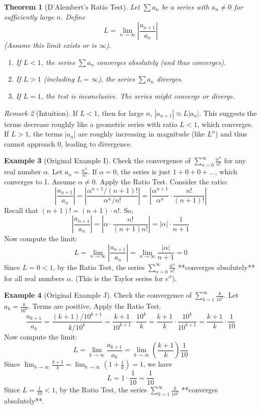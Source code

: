 \documentclass[11pt]{article}
\theoremstyle{plain}
\newtheorem{theorem}{Theorem}[section]
\theoremstyle{definition}
\newtheorem{example}[theorem]{Example}
\theoremstyle{remark}
\newtheorem{remark}[theorem]{Remark}
\theoremstyle{adminstyle}
\newcommand{\abs}[1]{\left|#1\right|}
\begin{document}
\begin{theorem}[D'Alembert's Ratio Test]
Let $\sum a_n$ be a series with $a_n \neq 0$ for sufficiently large $n$. Define
\[ L = \lim_{n\to\infty} \abs{\frac{a_{n+1}}{a_n}} \]
(Assume this limit exists or is $\infty$).
\begin{enumerate}
    \item If $L < 1$, the series $\sum a_n$ converges absolutely (and thus converges).
    \item If $L > 1$ (including $L = \infty$), the series $\sum a_n$ diverges.
    \item If $L = 1$, the test is inconclusive. The series might converge or diverge.
\end{enumerate}
\end{theorem}

\begin{remark}[Intuition]
If $L < 1$, then for large $n$, $|a_{n+1}| \approx L |a_n|$. This suggests the terms decrease roughly like a geometric series with ratio $L < 1$, which converges. If $L > 1$, the terms $|a_n|$ are roughly increasing in magnitude (like $L^n$) and thus cannot approach 0, leading to divergence.
\end{remark}

\begin{example}[Original Example I] \label{ex:ratio_test_alpha_n_over_fact}
Check the convergence of $\sum_{n=0}^{\infty} \frac{\alpha^n}{n!}$ for any real number $\alpha$.
Let $a_n = \frac{\alpha^n}{n!}$. If $\alpha=0$, the series is just $1+0+0+\dots$, which converges to 1. Assume $\alpha \neq 0$.
Apply the Ratio Test. Consider the ratio:
\[ \abs{\frac{a_{n+1}}{a_n}} = \abs{\frac{\alpha^{n+1}/(n+1)!}{\alpha^n/n!}} = \abs{\frac{\alpha^{n+1}}{\alpha^n} \cdot \frac{n!}{(n+1)!}} \]
Recall that $(n+1)! = (n+1) \cdot n!$. So,
\[ \abs{\frac{a_{n+1}}{a_n}} = \abs{\alpha \cdot \frac{n!}{(n+1)n!}} = \abs{\alpha} \cdot \frac{1}{n+1} \]
Now compute the limit:
\[ L = \lim_{n\to\infty} \abs{\frac{a_{n+1}}{a_n}} = \lim_{n\to\infty} \frac{|\alpha|}{n+1} = 0 \]
Since $L = 0 < 1$, by the Ratio Test, the series $\sum_{n=0}^{\infty} \frac{\alpha^n}{n!}$ **converges absolutely** for all real numbers $\alpha$. (This is the Taylor series for $e^\alpha$).
\end{example}

\begin{example}[Original Example J] \label{ex:ratio_test_k_over_10_k}
Check the convergence of $\sum_{k=1}^{\infty} \frac{k}{10^k}$.
Let $a_k = \frac{k}{10^k}$. Terms are positive.
Apply the Ratio Test.
\[ \frac{a_{k+1}}{a_k} = \frac{(k+1)/10^{k+1}}{k/10^k} = \frac{k+1}{10^{k+1}} \cdot \frac{10^k}{k} = \frac{k+1}{k} \cdot \frac{10^k}{10^{k+1}} = \frac{k+1}{k} \cdot \frac{1}{10} \]
Now compute the limit:
\[ L = \lim_{k\to\infty} \frac{a_{k+1}}{a_k} = \lim_{k\to\infty} \left(\frac{k+1}{k}\right) \frac{1}{10} \]
Since $\lim_{k\to\infty} \frac{k+1}{k} = \lim_{k\to\infty} (1 + \frac{1}{k}) = 1$, we have
\[ L = 1 \cdot \frac{1}{10} = \frac{1}{10} \]
Since $L = \frac{1}{10} < 1$, by the Ratio Test, the series $\sum_{k=1}^{\infty} \frac{k}{10^k}$ **converges absolutely**.
\end{example}
\end{document}
